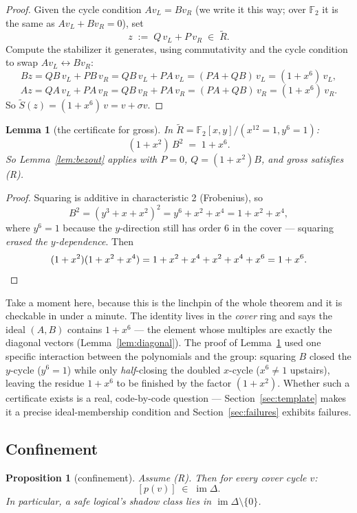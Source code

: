\documentclass[11pt]{article}
\theoremstyle{plain}
\newtheorem{lemma}[theorem]{Lemma}
\newtheorem{proposition}[theorem]{Proposition}
\theoremstyle{definition}
\theoremstyle{remark}
\newcommand{\F}{\mathbb{F}}
\newcommand{\imD}{\operatorname{im}\Delta}
\newcommand{\Rcov}{\widetilde{R}}
\begin{document}
\begin{proof}
Given the cycle condition $A v_L = B v_R$ (we write it this way; over $\F_2$
it is the same as $A v_L + B v_R = 0$), set
\[
z \;:=\; Q\,v_L + P\,v_R \;\in\; \Rcov .
\]
Compute the stabilizer it generates, using commutativity and the cycle
condition to swap $A v_L \leftrightarrow B v_R$:
\[
B z = QB\,v_L + PB\,v_R
    = QB\,v_L + PA\,v_L
    = (PA + QB)\,v_L = (1+x^6)\,v_L,
\]
\[
A z = QA\,v_L + PA\,v_R
    = QB\,v_R + PA\,v_R
    = (PA + QB)\,v_R = (1+x^6)\,v_R .
\]
So $\widetilde S(z) = (1+x^6)\,v = v + \sigma v$.
\end{proof}

\begin{lemma}[the certificate for gross]\label{lem:grosscert}
In $\Rcov = \F_2[x,y]/(x^{12}{=}1, y^6{=}1)$:
\[
(1 + x^2)\,B^2 \;=\; 1 + x^6 .
\]
So Lemma~\ref{lem:bezout} applies with $P = 0$, $Q = (1+x^2)B$, and gross
satisfies (R).
\end{lemma}

\begin{proof}
Squaring is additive in characteristic 2 (Frobenius), so
\[
B^2 = (y^3 + x + x^2)^2 = y^6 + x^2 + x^4 = 1 + x^2 + x^4,
\]
where $y^6 = 1$ because the $y$-direction still has order 6 in the cover ---
squaring \emph{erased the $y$-dependence}. Then
\[
(1+x^2)(1 + x^2 + x^4) = 1 + x^2 + x^4 + x^2 + x^4 + x^6 = 1 + x^6 . \qedhere
\]
\end{proof}

Take a moment here, because this is the linchpin of the whole theorem and it
is checkable in under a minute. The identity lives in the \emph{cover} ring
and says the ideal $(A, B)$ contains $1 + x^6$ --- the element whose
multiples are exactly the diagonal vectors (Lemma~\ref{lem:diagonal}). The
proof of Lemma~\ref{lem:grosscert} used one specific interaction between the
polynomials and the group: squaring $B$ closed the $y$-cycle ($y^6 = 1$)
while only \emph{half}-closing the doubled $x$-cycle ($x^6 \neq 1$
upstairs), leaving the residue $1 + x^6$ to be finished by the factor
$(1+x^2)$. Whether such a certificate
exists is a real, code-by-code question --- Section~\ref{sec:template} makes
it a precise ideal-membership condition and Section~\ref{sec:failures}
exhibits failures.

\subsection{Confinement}

\begin{proposition}[confinement]\label{prop:confinement}
Assume (R). Then for every cover cycle $v$:
\[
[p(v)] \;\in\; \imD .
\]
In particular, a \emph{safe} logical's shadow class lies in $\imD \setminus
\{0\}$.
\end{proposition}
\end{document}
